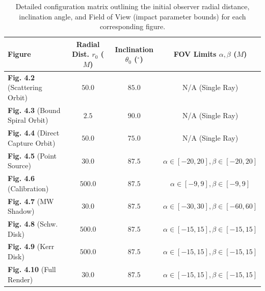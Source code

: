 \documentclass[11pt]{book}
\begin{document}
\begin{table}[H]
	\centering
	\renewcommand{\arraystretch}{1.4}
	\begin{tabular}{@{}l c c c@{}}
		\toprule
		\textbf{Figure} & \textbf{Radial Dist. $r_0$ ($M$)} & \textbf{Inclination $\theta_0$ ($^\circ$)} & \textbf{FOV Limits $\alpha, \beta$ ($M$)} \\
		\midrule
		\textbf{Fig. 4.2} (Scattering Orbit)   & $50.0$ & $85.0$ & N/A (Single Ray) \\
		\textbf{Fig. 4.3} (Bound Spiral Orbit) & $2.5$  & $90.0$ & N/A (Single Ray) \\
		\textbf{Fig. 4.4} (Direct Capture Orbit)& $50.0$ & $75.0$ & N/A (Single Ray) \\
		\midrule
		\textbf{Fig. 4.5} (Point Source) & $30.0$ & $87.5$ & $\alpha\in[-20, 20],\beta\in[-20,20]$ \\
		\textbf{Fig. 4.6} (Calibration)  & $500.0$ & $87.5$ & $\alpha\in[-9, 9],\beta\in[-9, 9]$ \\
		\textbf{Fig. 4.7} (MW Shadow)    & $30.0$ & $87.5$ & $\alpha\in[-30,30], \beta\in[-60,60]$ \\
		\midrule
		\textbf{Fig. 4.8} (Schw. Disk)   & $500.0$ & $87.5$ & $\alpha\in[-15,15], \beta\in[-15,15]$ \\
		\textbf{Fig. 4.9} (Kerr Disk)    & $500.0$ & $87.5$ & $\alpha\in[-15,15], \beta\in[-15,15]$ \\
		\textbf{Fig. 4.10} (Full Render) & $30.0$ & $87.5$ & $\alpha\in[-15,15], \beta\in[-15,15]$ \\
		\bottomrule
	\end{tabular}
	\caption{Detailed configuration matrix outlining the initial observer radial distance, inclination angle, and Field of View (impact parameter bounds) for each corresponding figure.}
	\label{tab:detailed_params}
\end{table}


\end{document}
